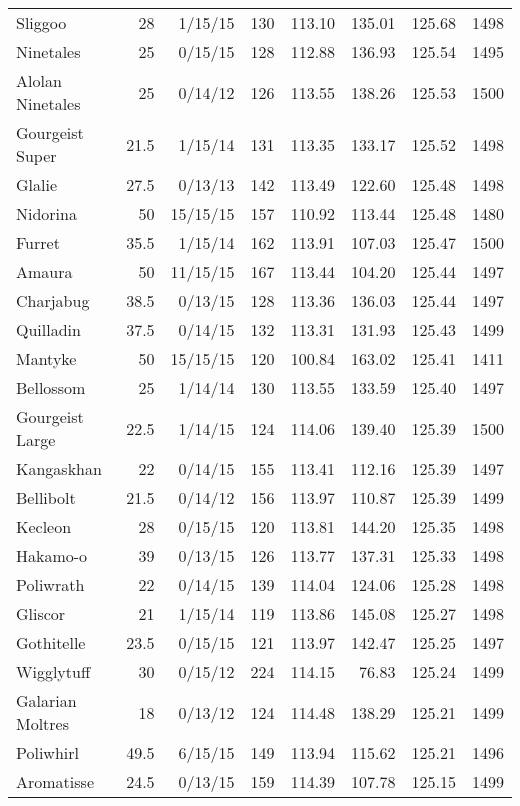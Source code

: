\begin{longtable}{lrrrrrrr}
Sliggoo & 28 & 1/15/15 & 130 & 113.10 & 135.01 & 125.68 & 1498\\
Ninetales & 25 & 0/15/15 & 128 & 112.88 & 136.93 & 125.54 & 1495\\
Alolan Ninetales & 25 & 0/14/12 & 126 & 113.55 & 138.26 & 125.53 & 1500\\
Gourgeist Super & 21.5 & 1/15/14 & 131 & 113.35 & 133.17 & 125.52 & 1498\\
Glalie & 27.5 & 0/13/13 & 142 & 113.49 & 122.60 & 125.48 & 1498\\
Nidorina & 50 & 15/15/15 & 157 & 110.92 & 113.44 & 125.48 & 1480\\
Furret & 35.5 & 1/15/14 & 162 & 113.91 & 107.03 & 125.47 & 1500\\
Amaura & 50 & 11/15/15 & 167 & 113.44 & 104.20 & 125.44 & 1497\\
Charjabug & 38.5 & 0/13/15 & 128 & 113.36 & 136.03 & 125.44 & 1497\\
Quilladin & 37.5 & 0/14/15 & 132 & 113.31 & 131.93 & 125.43 & 1499\\
Mantyke & 50 & 15/15/15 & 120 & 100.84 & 163.02 & 125.41 & 1411\\
Bellossom & 25 & 1/14/14 & 130 & 113.55 & 133.59 & 125.40 & 1497\\
Gourgeist Large & 22.5 & 1/14/15 & 124 & 114.06 & 139.40 & 125.39 & 1500\\
Kangaskhan & 22 & 0/14/15 & 155 & 113.41 & 112.16 & 125.39 & 1497\\
Bellibolt & 21.5 & 0/14/12 & 156 & 113.97 & 110.87 & 125.39 & 1499\\
Kecleon & 28 & 0/15/15 & 120 & 113.81 & 144.20 & 125.35 & 1498\\
Hakamo-o & 39 & 0/13/15 & 126 & 113.77 & 137.31 & 125.33 & 1498\\
Poliwrath & 22 & 0/14/15 & 139 & 114.04 & 124.06 & 125.28 & 1498\\
Gliscor & 21 & 1/15/14 & 119 & 113.86 & 145.08 & 125.27 & 1498\\
Gothitelle & 23.5 & 0/15/15 & 121 & 113.97 & 142.47 & 125.25 & 1497\\
Wigglytuff & 30 & 0/15/12 & 224 & 114.15 & 76.83 & 125.24 & 1499\\
Galarian Moltres & 18 & 0/13/12 & 124 & 114.48 & 138.29 & 125.21 & 1499\\
Poliwhirl & 49.5 & 6/15/15 & 149 & 113.94 & 115.62 & 125.21 & 1496\\
Aromatisse & 24.5 & 0/13/15 & 159 & 114.39 & 107.78 & 125.15 & 1499\\

\end{longtable}
